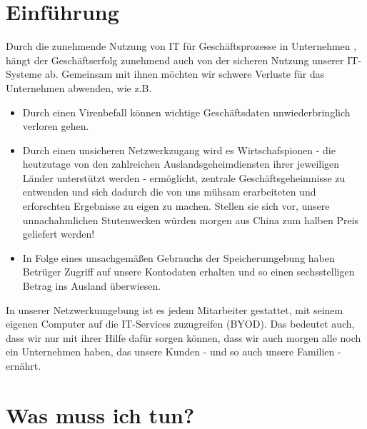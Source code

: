 \documentclass[]{article}
\date{}
\begin{document}
\section{Einführung}\label{einfuxfchrung}

Durch die zunehmende Nutzung von IT für Geschäftsprozesse in Unternehmen
, hängt der Geschäftserfolg zunehmend auch von der sicheren Nutzung
unserer IT-Systeme ab. Gemeinsam mit ihnen möchten wir schwere
Verluste für das Unternehmen abwenden, wie z.B.

\begin{itemize}
\item
  Durch einen Virenbefall können wichtige Geschäftsdaten
  unwiederbringlich verloren gehen.
\item
  Durch einen unsicheren Netzwerkzugang wird es Wirtschafspionen - die
  heutzutage von den zahlreichen Auslandsgeheimdiensten ihrer jeweiligen
  Länder unterstützt werden - ermöglicht, zentrale Geschäftsgeheimnisse
  zu entwenden und sich dadurch die von uns mühsam erarbeiteten und
  erforschten Ergebnisse zu eigen zu machen. Stellen sie sich vor,
  unsere unnachahmlichen Stutenwecken würden morgen aus China zum halben
  Preis geliefert werden!
\item
  In Folge eines unsachgemäßen Gebrauchs der Speicherumgebung haben
  Betrüger Zugriff auf unsere Kontodaten erhalten und so einen
  sechsstelligen Betrag ins Ausland überwiesen.
\end{itemize}

In unserer Netzwerkumgebung ist es jedem Mitarbeiter gestattet, mit
seinem eigenen Computer auf die IT-Services zuzugreifen (BYOD). Das
bedeutet auch, dass wir nur mit ihrer Hilfe dafür sorgen können, dass
wir auch morgen alle noch ein Unternehmen haben, das unsere Kunden -
und so auch unsere Familien - ernährt.

\section{Was muss ich tun?}\label{was-muss-ich-tun}
\end{document}
